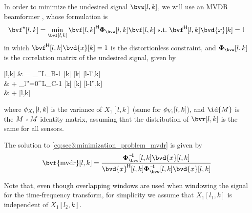 In order to minimize the undesired signal $\bvw[l,k]$, we will use an MVDR beamformer \cite{erdogan_improved_2016}, whose formulation is
\begin{equation}
	\label{eq:sec3:minimization_problem_mvdr}
	\bvf^{\star}[l,k] = \min_{\bvf[l,k]} \he{\bvf[l,k]} \Corr{\bvw}[l,k] \bvf[l,k]~\text{s.t.}~\he{\bvf}[l,k] \bvd{x}[k] = 1
\end{equation}
in which $\he{\bvf}[l,k] \bvd{x}[k] = 1$ is the distortionless constraint, and $\Corr{\bvw}[l,k]$ is the correlation matrix of the undesired signal, given by
\begin{equations}
	\Corr{\bvw}[l,k] 
	& = \sum_{}^{L_B-1}   [l-l',k] \\
	& + \sum_{l''=0}^{L_C-1}   [l-l'',k] \\
	& +  [l,k]
\end{equations}
where $\phi_{X_1}[l,k]$ is the variance of $X_1[l,k]$ (same for $\phi_{V_1}[l,k]$), and $\id{M}$ is the $\sz{M}{M}$ identity matrix, assuming that the distribution of $\bvr[l,k]$ is the same for all sensors.

The solution to \cref{eq:sec3:minimization_problem_mvdr} is given by
\begin{equation}
	\label{eq:sec3:solution_mvdr_beamformer}
	\bvf{\mvdr}[l,k] = \frac{ \inv{\Corr{\bvw}}[l,k] \bvd{x}[l,k] }{ \he{\bvd{x}}[l,k] \inv{\Corr{\bvw}}[l,k] \bvd{x}[l,k] }
\end{equation}

Note that, even though overlapping windows are used when windowing the signal for the time-frequency transform, for simplicity we assume that $X_1[l_1,k]$ is independent of $X_1[l_2,k]$.


